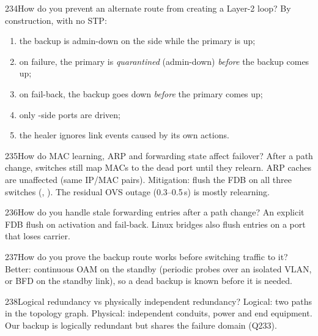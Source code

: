 \begin{qa}{234}{How do you prevent an alternate route from creating a Layer-2 loop?}
By construction, with no STP:
\begin{enumerate}
\item the backup is admin-down on the  side while the primary is up;
\item on failure, the primary is \emph{quarantined} (admin-down) \emph{before} the backup comes up;
\item on fail-back, the backup goes down \emph{before} the primary comes up;
\item only -side ports are driven;
\item the healer ignores link events caused by its own actions.
\end{enumerate}
\end{qa}

\begin{qa}{235}{How do MAC learning, ARP and forwarding state affect failover?}
After a path change, switches still map MACs to the dead port until they relearn. ARP caches are unaffected (same
IP/MAC pairs). Mitigation: flush the FDB on all three switches (,
). The residual OVS outage (0.3--0.5\,s) is mostly relearning.
\end{qa}

\begin{qa}{236}{How do you handle stale forwarding entries after a path change?}
An explicit FDB flush on activation and fail-back. Linux bridges also flush entries on a port that loses carrier.
\end{qa}

\begin{qa}{237}{How do you prove the backup route works before switching traffic to it?}
Better: continuous OAM on the standby (periodic probes over an isolated VLAN, or BFD on the standby link), so a dead
backup is known before it is needed.
\end{qa}

\begin{qa}{238}{Logical redundancy vs physically independent redundancy?}
Logical: two paths in the topology graph. Physical: independent conduits, power and end equipment. Our backup is
logically redundant but shares the  failure domain (Q233).
\end{qa}

